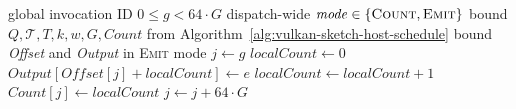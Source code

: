 \begin{algorithm}[H]
\caption{\texttt{RecordOrderedSketchTile} call}
\label{alg:vulkan-ordered-invocation}
\footnotesize
\begin{algorithmic}[1]
    \Require global invocation ID $0\leq g<64\mathbin{\cdot}G$
    \Require dispatch-wide $\mathit{mode}\in\{\textsc{Count},\textsc{Emit}\}$
    \Require bound $Q,\mathcal T,T,k,w,G,\mathit{Count}$
    \Statex \hspace{\algorithmicindent}from
             Algorithm~\ref{alg:vulkan-sketch-host-schedule}
    \Require bound \emph{Offset} and \emph{Output} in \textsc{Emit} mode
    \State $j\gets g$
      \State $\mathit{localCount}\gets0$
          \State $\mathit{Output}[\mathit{Offset}[j]
                 +\mathit{localCount}]\gets e$
        \EndIf
        \State $\mathit{localCount}\gets\mathit{localCount}+1$
      \EndFor
        \State $\mathit{Count}[j]\gets\mathit{localCount}$
      \EndIf
      \State $j\gets j+64\mathbin{\cdot}G$
    \EndWhile
  \EndProcedure
\end{algorithmic}
\end{algorithm}




